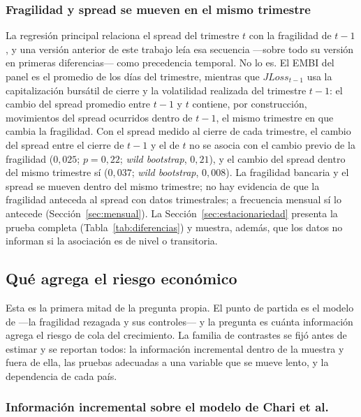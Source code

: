 \subsubsection{Fragilidad y spread se mueven en el mismo trimestre}
\label{sec:mismo-trimestre}

La regresión principal relaciona el spread del trimestre $t$ con la fragilidad de $t-1$, y una versión anterior de este trabajo leía esa secuencia ---sobre todo su versión en primeras diferencias--- como precedencia temporal. No lo es. El EMBI del panel es el promedio de los días del trimestre, mientras que $JLoss_{t-1}$ usa la capitalización bursátil de cierre y la volatilidad realizada del trimestre $t-1$: el cambio del spread promedio entre $t-1$ y $t$ contiene, por construcción, movimientos del spread ocurridos dentro de $t-1$, el mismo trimestre en que cambia la fragilidad. Con el spread medido al cierre de cada trimestre, el cambio del spread entre el cierre de $t-1$ y el de $t$ no se asocia con el cambio previo de la fragilidad ($0{,}025$; $p=0{,}22$; \textit{wild bootstrap}, $0{,}21$), y el cambio del spread dentro del mismo trimestre sí ($0{,}037$; \textit{wild bootstrap}, $0{,}008$). La fragilidad bancaria y el spread se mueven dentro del mismo trimestre; no hay evidencia de que la fragilidad anteceda al spread con datos trimestrales; a frecuencia mensual sí lo antecede (Sección~\ref{sec:mensual}). La Sección~\ref{sec:estacionariedad} presenta la prueba completa (Tabla~\ref{tab:diferencias}) y muestra, además, que los datos no informan si la asociación es de nivel o transitoria.

\subsection{Qué agrega el riesgo económico}
\label{sec:aporte-cola}

Esta es la primera mitad de la pregunta propia. El punto de partida es el modelo de \citet{Chari2024b} ---la fragilidad rezagada y sus controles--- y la pregunta es cuánta información agrega el riesgo de cola del crecimiento. La familia de contrastes se fijó antes de estimar y se reportan todos: la información incremental dentro de la muestra y fuera de ella, las pruebas adecuadas a una variable que se mueve lento, y la dependencia de cada país.

\subsubsection{Información incremental sobre el modelo de Chari et al.}

